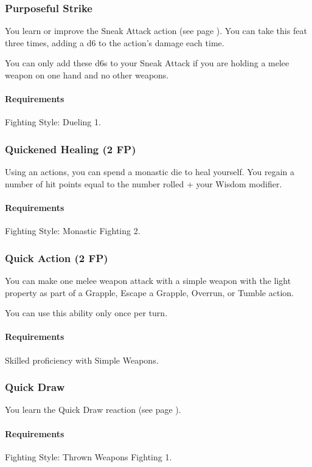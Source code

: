 \subsubsection{Purposeful Strike} \label{feat::purposefulstrike}
    You learn or improve the Sneak Attack action (see page \pageref{act::sneakattack}).
    You can take this feat three times, adding a d6 to the action's damage each time.

    You can only add these d6s to your Sneak Attack if you are holding a melee weapon on one hand and no other weapons.
    \paragraph{Requirements} Fighting Style: Dueling 1.
\subsubsection{Quickened Healing (2 FP)} \label{feat::quickenedhealing}
    Using an actions, you can spend a monastic die to heal yourself.
    You regain a number of hit points equal to the number rolled + your Wisdom modifier.
    \paragraph{Requirements} Fighting Style: Monastic Fighting 2.
\subsubsection{Quick Action (2 FP)} \label{feat::quickaction}
    You can make one melee weapon attack with a simple weapon with the light property as part of a Grapple, Escape a Grapple, Overrun, or Tumble action.

    You can use this ability only once per turn.
    \paragraph{Requirements} Skilled proficiency with Simple Weapons.
\subsubsection{Quick Draw} \label{feat::quickdraw}
    You learn the Quick Draw reaction (see page \pageref{act::quickdraw}).
    \paragraph{Requirements} Fighting Style: Thrown Weapons Fighting 1.
